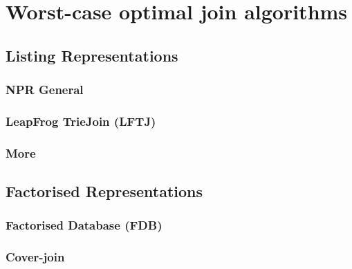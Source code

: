 \chapter{Worst-case optimal join algorithms}





\section{Listing Representations}





\subsection{NPR General}
\subsection{LeapFrog TrieJoin (LFTJ)}


\subsection{More}

\section{Factorised Representations}

\subsection{Factorised Database (FDB)}

\subsection{Cover-join}
 

